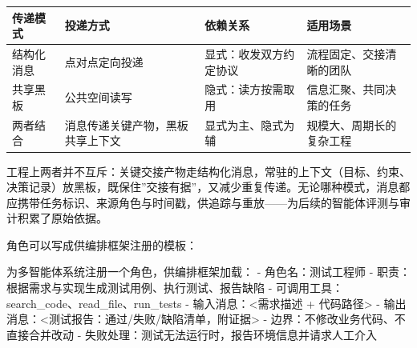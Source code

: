 \documentclass[12pt,a4paper,twoside,openany]{ctexbook}
\numberwithin{figure}{chapter}
\numberwithin{table}{chapter}
\newenvironment{Shaded}{}{}
\newcommand{\NormalTok}[1]{#1}
\newcounter{none}
\begin{document}
{\def\LTcaptype{none} %
\begin{longtable}[]{@{}
  >{\raggedright\arraybackslash}p{}
  >{\raggedright\arraybackslash}p{}
  >{\raggedright\arraybackslash}p{}
  >{\raggedright\arraybackslash}p{}@{}}
\toprule\noalign{}
\begin{minipage}[b]{\linewidth}\raggedright
传递模式
\end{minipage} & \begin{minipage}[b]{\linewidth}\raggedright
投递方式
\end{minipage} & \begin{minipage}[b]{\linewidth}\raggedright
依赖关系
\end{minipage} & \begin{minipage}[b]{\linewidth}\raggedright
适用场景
\end{minipage} \\
\midrule\noalign{}
\endhead
\bottomrule\noalign{}
\endlastfoot
结构化消息 & 点对点定向投递 & 显式：收发双方约定协议 &
流程固定、交接清晰的团队 \\
共享黑板 & 公共空间读写 & 隐式：读方按需取用 &
信息汇聚、共同决策的任务 \\
两者结合 & 消息传递关键产物，黑板共享上下文 & 显式为主、隐式为辅 &
规模大、周期长的复杂工程 \\
\end{longtable}
}

工程上两者并不互斥：关键交接产物走结构化消息，常驻的上下文（目标、约束、决策记录）放黑板，既保住''交接有据''，又减少重复传递。无论哪种模式，消息都应携带任务标识、来源角色与时间戳，供追踪与重放------为后续的智能体评测与审计积累了原始依据。

角色可以写成供编排框架注册的模板：

\begin{Shaded}
\begin{Highlighting}[]
\NormalTok{为多智能体系统注册一个角色，供编排框架加载：}
\NormalTok{{-} 角色名：测试工程师}
\NormalTok{{-} 职责：根据需求与实现生成测试用例、执行测试、报告缺陷}
\NormalTok{{-} 可调用工具：search\_code、read\_file、run\_tests}
\NormalTok{{-} 输入消息：\textless{}需求描述 + 代码路径\textgreater{}}
\NormalTok{{-} 输出消息：\textless{}测试报告：通过/失败/缺陷清单，附证据\textgreater{}}
\NormalTok{{-} 边界：不修改业务代码、不直接合并改动}
\NormalTok{{-} 失败处理：测试无法运行时，报告环境信息并请求人工介入}
\end{Highlighting}
\end{Shaded}
\end{document}
